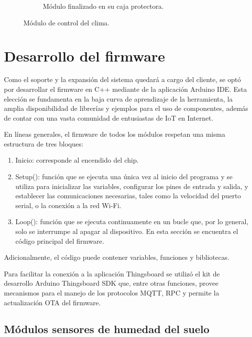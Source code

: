 \begin{figure}[!htpb]
\begin{subfigure}[b]{0.45\textwidth}
		\caption{Módulo finalizado en su caja protectora.}
		\label{fig:vent3}
     \end{subfigure}
     \hfill
        \caption[Módulo de control del clima]{Módulo de control del clima.}
        \label{fig:ventcontrol}
\end{figure}


\pagebreak

\section{Desarrollo del firmware}
\label{sec:Desarrollo del firmware}

Como el soporte y la expansión del sistema quedará a cargo del cliente, se optó por desarrollar el firmware en C++ mediante de la aplicación Arduino IDE. Esta elección se fundamenta en la baja curva de aprendizaje de la herramienta, la amplia disponibilidad de librerías y ejemplos para el uso de componentes, además de contar con una vasta comunidad de entusiastas de IoT en Internet.

En líneas generales, el firmware de todos los módulos respetan una misma estructura de tres bloques:

\begin{enumerate}
\item Inicio: corresponde al encendido del chip.
\item Setup(): función que se ejecuta una única vez al inicio del programa y se utiliza para inicializar las variables, configurar los pines de entrada y salida, y establecer las comunicaciones necesarias, tales como la velocidad del puerto serial, o la conexión a la red Wi-Fi.

\item Loop(): función que se ejecuta continuamente en un bucle que, por lo general, solo se interrumpe al apagar al dispositivo. En esta sección se encuentra el código principal del firmware.
\end{enumerate}
Adicionalmente, el código puede contener variables, funciones y bibliotecas.


Para facilitar la conexión a la aplicación Thingsboard se utilizó el kit de desarrollo Arduino Thingsboard SDK \citep{tbsdk} que, entre otras funciones, provee mecanismos para el manejo de los protocolos MQTT, RPC y permite la actualización OTA \citep{8999425} del firmware.




\subsection{Módulos sensores de humedad del suelo}
\label{Módulos sensores de humedad del suelo}



